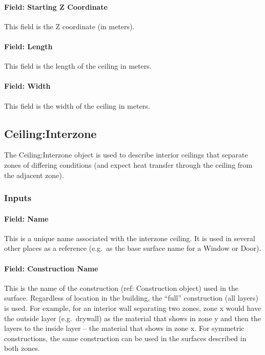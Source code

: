 \paragraph{Field: Starting Z Coordinate}\label{field-starting-z-coordinate-5}

This field is the Z coordinate (in meters).

\paragraph{Field: Length}\label{field-length-5}

This field is the length of the ceiling in meters.

\paragraph{Field: Width}\label{field-width-1}

This field is the width of the ceiling in meters.

\subsection{Ceiling:Interzone}\label{ceilinginterzone}

The Ceiling:Interzone object is used to describe interior ceilings that separate zones of differing conditions (and expect heat transfer through the ceiling from the adjacent zone).

\subsubsection{Inputs}\label{inputs-10-022}

\paragraph{Field: Name}\label{field-name-6-024}

This is a unique name associated with the interzone ceiling. It is used in several other places as a reference (e.g.~as the base surface name for a Window or Door).

\paragraph{Field: Construction Name}\label{field-construction-name-6}

This is the name of the construction (ref: Construction object) used in the surface. Regardless of location in the building, the ``full'' construction (all layers) is used. For example, for an interior wall separating two zones, zone x would have the outside layer (e.g.~drywall) as the material that shows in zone y and then the layers to the inside layer -- the material that shows in zone x. For symmetric constructions, the same construction can be used in the surfaces described in both zones.

